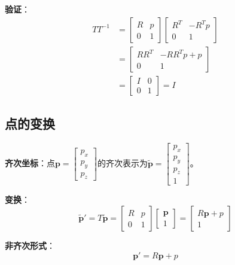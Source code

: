 \documentclass[12pt,a4paper]{article}
\begin{document}
\textbf{验证}：
\begin{align}
T T^{-1} &= \begin{bmatrix} R & p \\ 0 & 1 \end{bmatrix} \begin{bmatrix} R^T & -R^T p \\ 0 & 1 \end{bmatrix} \\
&= \begin{bmatrix} R R^T & -R R^T p + p \\ 0 & 1 \end{bmatrix} \\
&= \begin{bmatrix} I & 0 \\ 0 & 1 \end{bmatrix} = I
\end{align}

\subsection{点的变换}

\textbf{齐次坐标}：点$\bm{p} = \begin{bmatrix} p_x \\ p_y \\ p_z \end{bmatrix}$的齐次表示为$\tilde{\bm{p}} = \begin{bmatrix} p_x \\ p_y \\ p_z \\ 1 \end{bmatrix}$。

\textbf{变换}：
\begin{equation}
\tilde{\bm{p}}' = T \tilde{\bm{p}} = \begin{bmatrix} R & p \\ 0 & 1 \end{bmatrix} \begin{bmatrix} \bm{p} \\ 1 \end{bmatrix} = \begin{bmatrix} R\bm{p} + p \\ 1 \end{bmatrix}
\end{equation}

\textbf{非齐次形式}：
\begin{equation}
\bm{p}' = R\bm{p} + p
\end{equation}
\end{document}

